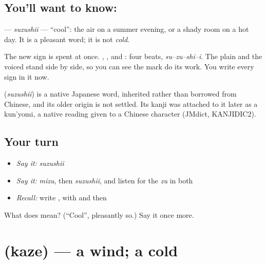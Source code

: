 \subsection*{You'll want to know: }
\textbf{} — \emph{suzushii} — \textquotedblleft{}cool\textquotedblright{}: the air on a summer evening, or a shady room on a hot day. It is a pleasant word; it is not \emph{cold}.

The new sign is spent at once. \textbf{}, \textbf{}, \textbf{} and \textbf{}: four beats, \emph{su–zu–shi–i}. The plain \textbf{} and the voiced \textbf{} stand side by side, so you can see the mark do its work. You write every sign in it now.

\begin{cousinweb}
\textbf{} (\emph{suzushii}) is a native Japanese word, inherited rather than borrowed from Chinese, and its older origin is not settled. Its kanji was attached to it later as a kun'yomi, a native reading given to a Chinese character (JMdict, KANJIDIC2).
\end{cousinweb}

\subsection*{Your turn}
\begin{itemize}
\raggedright
  \item \emph{Say it:} \emph{suzushii}
  \item \emph{Say it:} \emph{mizu}, then \emph{suzushii}, and listen for the \emph{zu} in both
  \item \emph{Recall:} write \textbf{}, with \textbf{} and then \textbf{}
\end{itemize}

\begin{tcolorbox}[breakable,colback=teal!4,colframe=teal!35!black,title={Before you move on}]
What does  mean? (\textquotedblleft{}Cool\textquotedblright{}, pleasantly so.) Say it once more.
\end{tcolorbox}
\section[\texorpdfstring{\ja{かぜ} (kaze)}{かぜ (kaze)}]{ (kaze) — a wind; a cold}

\label{lesson:JA-C136-kaze}



